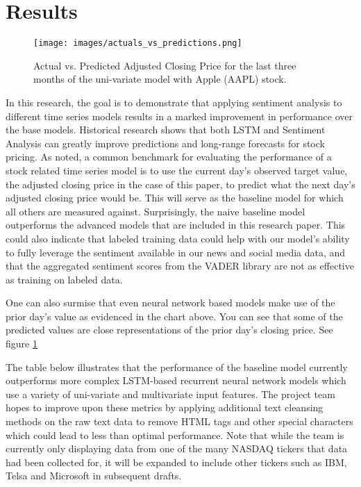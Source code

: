 \documentclass{llncs}
\begin{document}
\section{Results}


\begin{figure}[ht!]
    \centering
    \texttt{[image: images/actuals\_vs\_predictions.png]}
    \caption{Actual vs. Predicted Adjusted Closing Price for the last three months of the uni-variate model with Apple (AAPL) stock.}
    \label{fig:actuals_vs_predictions}
    \hfill
\end{figure}

In this research, the goal is to demonstrate that applying sentiment analysis to different time series models results in a marked improvement in performance over the base models.  Historical research shows that both LSTM and Sentiment Analysis can greatly improve predictions and long-range forecasts for stock pricing.  As noted, a common benchmark for evaluating the performance of a stock related time series model is to use the current day's observed target value, the adjusted closing price in the case of this paper, to predict what the next day's adjusted closing price would be.  This will serve as the baseline model for which all others are measured against.  Surprisingly, the naive baseline model outperforms the advanced models that are included in this research paper.  This could also indicate that labeled training data could help with our model's ability to fully leverage the sentiment available in our news and social media data, and that the aggregated sentiment scores from the VADER library are not as effective as training on labeled data.

One can also surmise that even neural network based models make use of the prior day's value as evidenced in the chart above.  You can see that some of the predicted values are close representations of the prior day's closing price.  See figure \ref{fig:actuals_vs_predictions}

The table below illustrates that the performance of the baseline model currently outperforms more complex LSTM-based recurrent neural network models which use a variety of uni-variate and multivariate input features.  The project team hopes to improve upon these metrics by applying additional text cleansing methods on the raw text data to remove HTML tags and other special characters which could lead to less than optimal performance.  Note that while the team is currently only displaying data from one of the many NASDAQ tickers that data had been collected for, it will be expanded to include other tickers such as IBM, Telsa and Microsoft in subsequent drafts.
\end{document}
